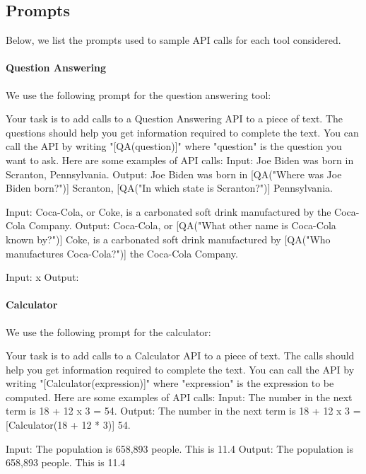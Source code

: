 \documentclass[11pt]{article}
\begin{document}
\begin{CJK*}{UTF8}{gbsn}
\subsection{Prompts}
\label{appendix:tool-prompts}

Below, we list the prompts used to sample API calls for each tool considered.

\paragraph{Question Answering} We use the following prompt for the question answering tool:
{\small
\begin{spverbatim}
Your task is to add calls to a Question Answering API to a piece of text. The questions should help you get information required to complete the text. You can call the API by writing "[QA(question)]" where "question" is the question you want to ask. Here are some examples of API calls:
Input: Joe Biden was born in Scranton, Pennsylvania.
Output: Joe Biden was born in [QA("Where was Joe Biden born?")] Scranton, [QA("In which state is Scranton?")] Pennsylvania.

Input: Coca-Cola, or Coke, is a carbonated soft drink manufactured by the Coca-Cola Company.
Output: Coca-Cola, or [QA("What other name is Coca-Cola known by?")] Coke, is a carbonated soft drink manufactured by [QA("Who manufactures Coca-Cola?")] the Coca-Cola Company.

Input: x
Output:
\end{spverbatim}}

\paragraph{Calculator} We use the following prompt for the calculator:
{\small
\begin{spverbatim}
Your task is to add calls to a Calculator API to a piece of text. The calls should help you get information required to complete the text. You can call the API by writing "[Calculator(expression)]" where "expression" is the expression to be computed. Here are some examples of API calls:
Input: The number in the next term is 18 + 12 x 3 = 54.
Output: The number in the next term is 18 + 12 x 3 = [Calculator(18 + 12 * 3)] 54.

Input: The population is 658,893 people. This is 11.4%
Output: The population is 658,893 people. This is 11.4%


\end{spverbatim}}
\end{CJK*}
\end{document}
